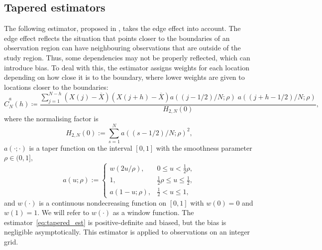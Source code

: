 \subsection{Tapered estimators}
The following estimator, proposed in \cite{Dahlhaus1987}, takes the edge effect into account.
The edge effect reflects the situation that points closer to the boundaries of an observation region can have neighbouring observations that are outside of the study region. Thus, some dependencies may not be properly reflected, which can introduce bias. To deal with this, the estimator assigns weights for each location depending on how close it is to the boundary, where lower weights are given to locations closer to the boundaries:
\begin{equation} \label{eq:tapered_est}
    	\widehat{C}^{a}_{N}(h) \coloneq \frac{\displaystyle \sum_{j = 1}^{N - h} \left( X(j) - \overline{X}\right) \left( X(j + h) - \overline{X} \right) a\left( (j - 1/2)/N; \rho \right) \; a \left( (j + h - 1/2)/N; \rho \right) }
        {\displaystyle H_{2, N}(0) },    
\end{equation}
where the normalising factor is
\[
H_{2, N}(0) := \sum_{s=1}^{N} a ( (s - 1/2)/N; \rho )^{2} ,
\] \(a(\cdot; \cdot)\) is a taper function on the interval \([0, 1]\) with the smoothness parameter \(\rho \in (0, 1],\)
\[
a(u; \rho) := 
\begin{cases}
		w(2u/\rho) ,& 0 \leq u < \frac{1}{2}\rho, \\
		1 ,& \frac{1}{2} \rho \leq u \leq \frac{1}{2}, \\
		a(1-u; \rho) ,& \frac{1}{2} < u \leq 1,
\end{cases} 
\]
and \(w(\cdot)\) is a continuous nondecreasing function on \([0, 1]\) with \(w(0)=0\) and \(w(1)=1.\)
We will refer to \(w(\cdot)\) as a window function.
The estimator~\eqref{eq:tapered_est} is positive-definite and biased, but the bias is negligible asymptotically. This estimator is applied to observations on an integer grid.

